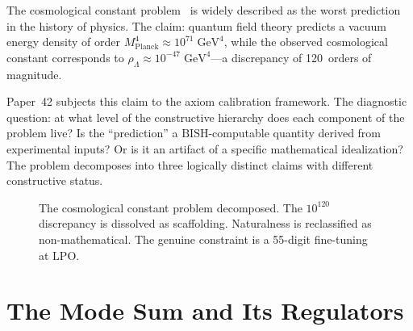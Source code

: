 \documentclass[11pt,a4paper]{report}
\theoremstyle{plain}
\theoremstyle{definition}
\theoremstyle{remark}
\newcommand{\BISH}{\mathrm{BISH}}
\newcommand{\LPO}{\mathrm{LPO}}
\begin{document}
The cosmological constant problem~\cite{Weinberg1989} is widely described as the worst prediction in the history of physics. The claim: quantum field theory predicts a vacuum energy density of order $M_{\mathrm{Planck}}^4 \approx 10^{71}\;\mathrm{GeV}^4$, while the observed cosmological constant corresponds to $\rho_\Lambda \approx 10^{-47}\;\mathrm{GeV}^4$---a discrepancy of 120~orders of magnitude.

Paper~42 subjects this claim to the axiom calibration framework. The diagnostic question: at what level of the constructive hierarchy does each component of the problem live? Is the ``prediction'' a $\BISH$-computable quantity derived from experimental inputs? Or is it an artifact of a specific mathematical idealization? The problem decomposes into three logically distinct claims with different constructive status.

\begin{figure}[t]
\centering
{}
\caption{The cosmological constant problem decomposed. The $10^{120}$ discrepancy is dissolved as scaffolding. Naturalness is reclassified as non-mathematical. The genuine constraint is a 55-digit fine-tuning at $\LPO$.}
\label{fig:cc-decomposition}
\end{figure}

\section{The Mode Sum and Its Regulators}
\end{document}
